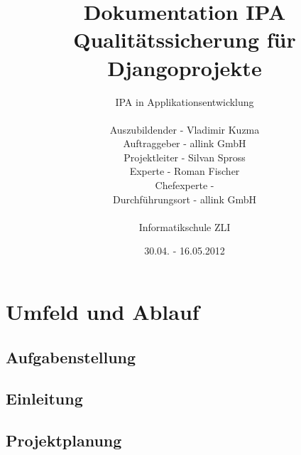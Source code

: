 \documentclass[
11pt, %
a4paper, %
BCOR10mm, %
DIV14, %
footsepline = false, %
headsepline, %
oneside, %
openright,
halfparskip, %
abstracton, %
listof=totocnumbered, %
bibliography=totocnumbered %
]{scrreprt}
\title{Dokumentation IPA Qualitätssicherung für Djangoprojekte}
\author{IPA in Applikationsentwicklung\\
    \\
    Auszubildender - Vladimir Kuzma\\
	Auftraggeber - allink GmbH\\
    Projektleiter - Silvan Spross\\
    Experte - Roman Fischer\\
    Chefexperte -  \\
    Durchführungsort - allink GmbH\\
	\\
	Informatikschule ZLI }
\date{30.04. - 16.05.2012}
\begin{document}
    \ifpdf
    \else
    \fi

  
    \maketitle

  
    \tableofcontents
    
    \part{Umfeld und Ablauf}
         \chapter{Aufgabenstellung}
             
        \chapter{Einleitung}
            
        \chapter{Projektplanung}
            
\end{document}
